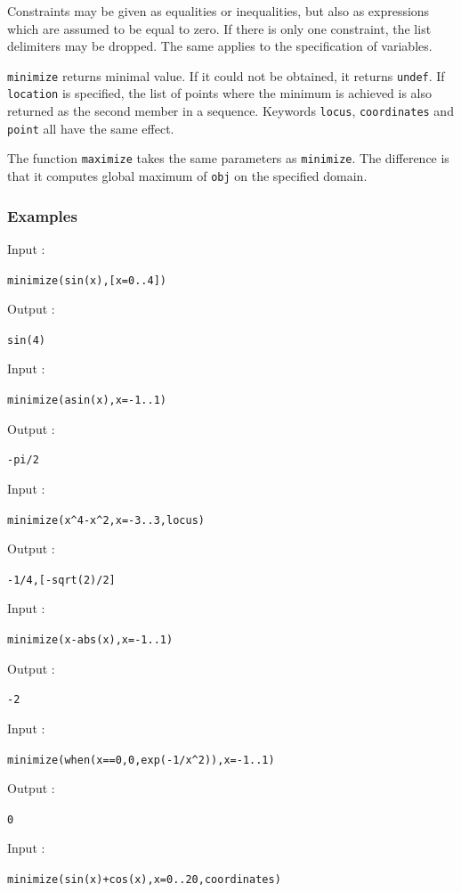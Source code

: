 \documentclass[a4paper,11pt]{book}
\begin{document}
Constraints may be given as equalities or inequalities, but also as expressions which are assumed to be equal to zero. If there is only one constraint, the list delimiters may be dropped. The same applies to the specification of variables.

{\tt minimize} returns minimal value. If it could not be obtained, it returns {\tt undef}. If {\tt location} is specified, the list of points where the minimum is achieved is also returned as the second member in a sequence. Keywords {\tt locus}, {\tt coordinates} and {\tt point} all have the same effect.

The function {\tt maximize} takes the same parameters as {\tt minimize}. The difference is that it computes global maximum of {\tt obj} on the specified domain.

\subsubsection{Examples}
Input :
\begin{center}
{\tt minimize(sin(x),[x=0..4])}
\end{center}
Output :
\begin{center}
{\tt sin(4)}
\end{center}
Input :
\begin{center}
{\tt minimize(asin(x),x=-1..1)}
\end{center}
Output :
\begin{center}
{\tt -pi/2}
\end{center}
Input :
\begin{center}
{\tt minimize(x\verb|^|4-x\verb|^|2,x=-3..3,locus)}
\end{center}
Output :
\begin{center}
{\tt -1/4,[-sqrt(2)/2]}
\end{center}
Input :
\begin{center}
{\tt minimize(x-abs(x),x=-1..1)}
\end{center}
Output :
\begin{center}
{\tt -2}
\end{center}
Input :
\begin{center}
{\tt minimize(when(x==0,0,exp(-1/x\verb|^|2)),x=-1..1)}
\end{center}
Output :
\begin{center}
{\tt 0}
\end{center}
Input :
\begin{center}
{\tt minimize(sin(x)+cos(x),x=0..20,coordinates)}
\end{center}
\end{document}
